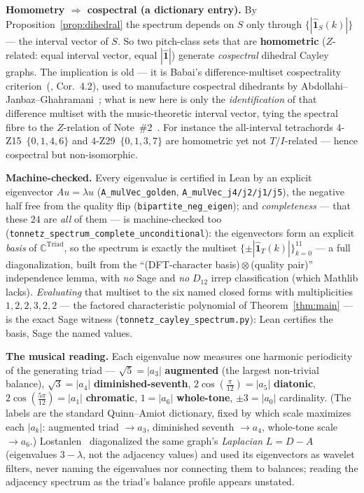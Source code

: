 \documentclass[11pt]{article}
\newcommand{\lean}[1]{\texttt{#1}}
\begin{document}
\textbf{Homometry $\Rightarrow$ cospectral (a dictionary entry).} By Proposition~\ref{prop:dihedral} the
spectrum depends on $S$ only through $\{|\hat{\mathbf 1}_S(k)|\}$ --- the interval vector of $S$. So two
pitch-class sets that are \textbf{homometric} ($Z$-related: equal interval vector, equal $|\hat{\mathbf 1}|$)
generate \emph{cospectral} dihedral Cayley graphs. The implication is old --- it is Babai's difference-multiset
cospectrality criterion~(\cite{Babai}, Cor.~4.2), used to manufacture cospectral dihedrants by
Abdollahi--Janbaz--Ghahramani~\cite{Abdollahi}; what is new here is only the \emph{identification} of that
difference multiset with the music-theoretic interval vector, tying the spectral fibre to the $Z$-relation of
Note~\#2~\cite{Note2}. For instance the all-interval tetrachords $4$-Z15~$\{0,1,4,6\}$ and
$4$-Z29~$\{0,1,3,7\}$ are homometric yet not $T/I$-related --- hence cospectral but non-isomorphic.

\textbf{Machine-checked.} Every eigenvalue is certified in Lean by an explicit eigenvector $Au=\lambda u$
(\lean{A\_mulVec\_golden}, \lean{A\_mulVec\_j4/j2/j1/j5}), the negative half free from the quality flip
(\lean{bipartite\_neg\_eigen}); and \emph{completeness} --- that these $24$ are \emph{all} of them --- is
machine-checked too (\lean{tonnetz\_spectrum\_complete\_unconditional}): the eigenvectors form an explicit
\emph{basis} of $\mathbb{C}^{\mathrm{Triad}}$, so the spectrum is exactly the multiset
$\{\pm|\hat{\mathbf 1}_T(k)|\}_{k=0}^{11}$ --- a full diagonalization, built from the ``(DFT-character
basis)\,$\otimes$\,(quality pair)'' independence lemma, with \emph{no} Sage and \emph{no} $D_{12}$ irrep
classification (which Mathlib lacks). \emph{Evaluating} that multiset to the six named closed forms with
multiplicities $1,2,2,3,2,2$ --- the factored characteristic polynomial of Theorem~\ref{thm:main} --- is the
exact Sage witness (\lean{tonnetz\_cayley\_spectrum.py}): Lean certifies the basis, Sage the named values.

\textbf{The musical reading.} Each eigenvalue now measures one harmonic periodicity of the generating triad
---
$\sqrt5=|a_3|$ \textbf{augmented} (the largest non-trivial balance), $\sqrt3=|a_4|$
\textbf{diminished-seventh}, $2\cos(\tfrac{\pi}{12})=|a_5|$ \textbf{diatonic}, $2\cos(\tfrac{5\pi}{12})=|a_1|$
\textbf{chromatic}, $1=|a_6|$ \textbf{whole-tone}, $\pm3=|a_0|$ cardinality. (The labels are the standard
Quinn--Amiot dictionary, fixed by which scale maximizes each $|a_k|$: augmented triad $\to a_3$, diminished
seventh $\to a_4$, whole-tone scale $\to a_6$.) Lostanlen~\cite{Lostanlen} diagonalized the same graph's
\emph{Laplacian} $L=D-A$ (eigenvalues $3-\lambda$, not the adjacency values) and used its eigenvectors as
wavelet filters, never naming the eigenvalues nor connecting them to balances; reading the adjacency spectrum
as the triad's balance profile appears unstated.
\end{document}
